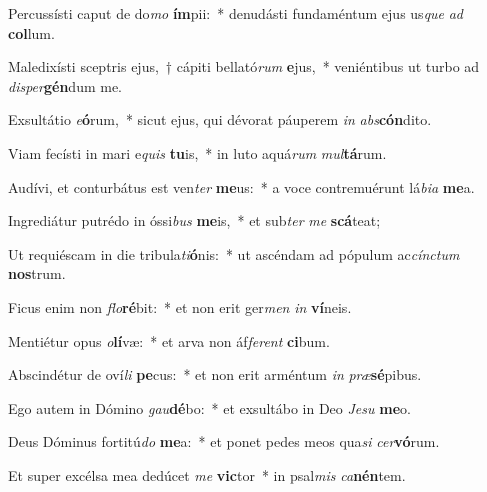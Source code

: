 \item Percussísti caput de do\textit{mo} \textbf{ím}pii:~* denudásti fundaméntum ejus us\textit{que} \textit{ad} \textbf{col}lum.
\item Maledixísti sceptris ejus,~† cápiti bellató\textit{rum} \textbf{e}jus,~* veniéntibus ut turbo ad \textit{di}\textit{sper}\textbf{gén}dum me.
\item Exsultátio \textit{e}\textbf{ó}rum,~* sicut ejus, qui dévorat páuperem \textit{in} \textit{abs}\textbf{cón}dito.
\item Viam fecísti in mari e\textit{quis} \textbf{tu}is,~* in luto aquá\textit{rum} \textit{mul}\textbf{tá}rum.
\item Audívi, et conturbátus est ven\textit{ter} \textbf{me}us:~* a voce contremuérunt lá\textit{bi}\textit{a} \textbf{me}a.
\item Ingrediátur putrédo in óssi\textit{bus} \textbf{me}is,~* et sub\textit{ter} \textit{me} \textbf{scá}teat;
\item Ut requiéscam in die tribula\textit{ti}\textbf{ó}nis:~* ut ascéndam ad pópulum ac\textit{cínc}\textit{tum} \textbf{nos}trum.
\item Ficus enim non \textit{flo}\textbf{ré}bit:~* et non erit ger\textit{men} \textit{in} \textbf{ví}neis.
\item Mentiétur opus \textit{o}\textbf{lí}væ:~* et arva non áf\textit{fe}\textit{rent} \textbf{ci}bum.
\item Abscindétur de oví\textit{li} \textbf{pe}cus:~* et non erit arméntum \textit{in} \textit{præ}\textbf{sé}pibus.
\item Ego autem in Dómino \textit{gau}\textbf{dé}bo:~* et exsultábo in Deo \textit{Je}\textit{su} \textbf{me}o.
\item Deus Dóminus fortitú\textit{do} \textbf{me}a:~* et ponet pedes meos qua\textit{si} \textit{cer}\textbf{vó}rum.
\item Et super excélsa mea dedúcet \textit{me} \textbf{vic}tor~* in psal\textit{mis} \textit{ca}\textbf{nén}tem.

